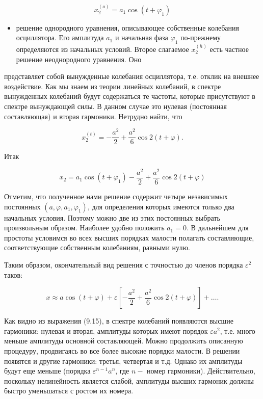 \documentclass[10pt]{article}
\begin{document}
\begin{equation*}
x_{2}^{(o)}=a_{1} \cos \left(t+\varphi_{1}\right) \tag{9.12}
\end{equation*}


\begin{itemize}
  \item решение однородного уравнения, описывающее собственные колебания осциллятора. Его амплитуда $a_{1}$ и начальная фаза $\varphi_{1}$ по-прежнему определяются из начальных условий. Второе слагаемое $x_{2}^{(h)}$ есть частное решение неоднородного уравнения. Оно
\end{itemize}

представляет собой вынужденные колебания осциллятора, т.е. отклик на внешнее воздействие. Как мы знаем из теории линейных колебаний, в спектре вынужденных колебаний будут содержаться те частоты, которые присутствуют в спектре вынуждающей силы. В данном случае это нулевая (постоянная составляющая) и вторая гармоники. Нетрудно найти, что


\begin{equation*}
x_{2}^{(t)}=-\frac{a^{2}}{2}+\frac{a^{2}}{6} \cos 2(t+\varphi) . \tag{9.13}
\end{equation*}


Итак


\begin{equation*}
x_{2}=a_{1} \cos \left(t+\varphi_{1}\right)-\frac{a^{2}}{2}+\frac{a^{2}}{6} \cos 2(t+\varphi) \tag{9.14}
\end{equation*}


Отметим, что полученное нами решение содержит четыре независимых постоянных $\left(a, \varphi, a_{1}, \varphi_{1}\right)$, для определения которых имеются только два начальных условия. Поэтому можно две из этих постоянных выбрать произвольным образом. Наиболее удобно положить $a_{1}=0$. В дальнейшем для простоты условимся во всех высших порядках малости полагать составляющие, соответствующие собственным колебаниям, равными нулю.

Таким образом, окончательный вид решения с точностью до членов порядка $\varepsilon^{2}$ таков:


\begin{equation*}
x \approx a \cos (t+\varphi)+\varepsilon\left[-\frac{a^{2}}{2}+\frac{a^{2}}{6} \cos 2(t+\varphi)\right]+\ldots . \tag{9.15}
\end{equation*}


Как видно из выражения (9.15), в спектре колебаний появляются высшие гармоники: нулевая и вторая, амплитуды которых имеют порядок $\varepsilon a^{2}$, т.е. много меньше амплитуды основной составляющей. Можно продолжить описанную процедуру, продвигаясь во все более высокие порядки малости. В решении появятся и другие гармоники: третья, четвертая и т.д. Однако их амплитуды будут еще меньше (порядка $\varepsilon^{n-1} a^{n}$, где $n-$ номер гармоники). Действительно, поскольку нелинейность является слабой, амплитуды высших гармоник должны быстро уменьшаться с ростом их номера.
\end{document}
